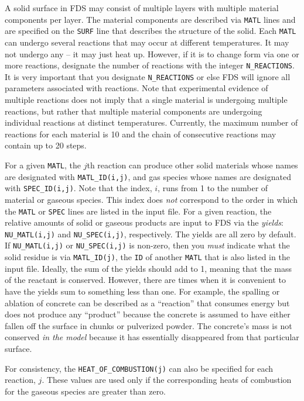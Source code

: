 \documentclass[11pt]{book}
\newcommand{\ct}{\tt\small}
\begin{document}
A solid surface in FDS may consist of multiple layers with multiple material
components per layer. The material components are described via {\ct MATL} lines and are specified on the {\ct SURF}
line that describes the structure of the solid.  Each {\ct MATL} can undergo several reactions that may
occur at different temperatures. It may not undergo any -- it may just heat
up. However, if it is to change form via one or more reactions,
designate the number of reactions with the integer {\ct N\_REACTIONS}. It is very important that you designate {\ct N\_REACTIONS}
or else FDS will ignore all parameters associated with
reactions. Note that experimental evidence of multiple
reactions does not imply that a single material is undergoing multiple reactions, but rather that
multiple material components are undergoing individual reactions at distinct temperatures.  Currently, the maximum number of
reactions for each material is 10 and the chain of consecutive
reactions may contain up to 20 steps.

For a given {\ct MATL}, the $j$th reaction can produce other solid materials whose names are designated with {\ct MATL\_ID(i,j)}, and gas
species whose names are designated with {\ct SPEC\_ID(i,j)}. Note that the index, $i$, runs from 1 to the number of material or gaseous species. This index
does {\em not} correspond to the order in which the {\ct MATL} or {\ct SPEC} lines are listed in the input file.
For a given reaction, the relative amounts of solid or gaseous products are input
to FDS via the {\em yields}: {\ct NU\_MATL(i,j)} and {\ct NU\_SPEC(i,j)}, respectively.
The yields are all zero by default. If {\ct NU\_MATL(i,j)} or {\ct NU\_SPEC(i,j)} is non-zero, then you {\em must} indicate what the
solid residue is via {\ct MATL\_ID(j)}, the {\ct ID} of another {\ct MATL} that is also listed in the input file. Ideally, the sum of the
yields should add to 1, meaning that the mass of the reactant is
conserved. However, there are times when it is convenient to have the
yields sum to something less than one. For example, the spalling or
ablation of concrete can be described as a ``reaction'' that consumes
energy but does not produce any ``product'' because the concrete is
assumed to have either fallen off the surface in chunks or pulverized
powder. The concrete's mass is not conserved {\em in the model}
because it has essentially disappeared from that particular surface.

For consistency, the {\ct HEAT\_OF\_COMBUSTION(j)} can also be specified for each reaction, $j$. These values are
used only if the corresponding heats of combustion for the gaseous species are greater than zero.
\end{document}

